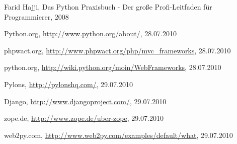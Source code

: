 
\begin{thebibliography}{99}
Farid Hajji, Das Python Praxisbuch - Der große Profi-Leitfaden für
Programmierer, 2008

Python.org, \url{http://www.python.org/about/}, 28.07.2010

phpwact.org, \url{http://www.phpwact.org/php/mvc_frameworks}, 28.07.2010

python.org, \url{http://wiki.python.org/moin/WebFrameworks}, 28.07.2010

Pylons, \url{http://pylonshq.com/}, 29.07.2010

Django, \url{http://www.djangoproject.com/}, 29.07.2010

zope.de, \url{http://www.zope.de/uber-zope}, 29.07.2010

web2py.com, \url{http://www.web2py.com/examples/default/what}, 29.07.2010

\end{thebibliography}



%
